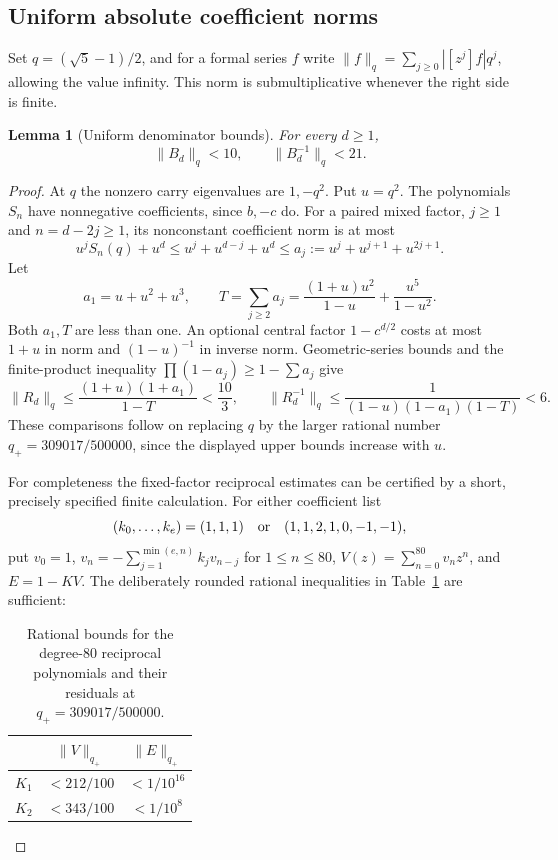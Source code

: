 \documentclass[11pt]{amsart}
\newtheorem{lemma}[theorem]{Lemma}
\theoremstyle{definition}
\theoremstyle{remark}
\numberwithin{equation}{section}
\begin{document}
\subsection{Uniform absolute coefficient norms}

Set $q=(\sqrt5-1)/2$, and for a formal series $f$ write
$\|f\|_q=\sum_{j\ge0}|[z^j]f|q^j$, allowing the value infinity.
This norm is submultiplicative whenever the right side is finite.

\begin{lemma}[Uniform denominator bounds]\label{raw:wiener}
For every $d\ge1$,
\begin{equation}\label{raw:norms}
 \|B_d\|_q<10,\qquad \|B_d^{-1}\|_q<21.
\end{equation}
\end{lemma}
\begin{proof}
At $q$ the nonzero carry eigenvalues are $1,-q^2$.  Put $u=q^2$.
The polynomials $S_n$ have nonnegative coefficients, since $b,-c$ do.
For a paired mixed factor, $j\ge1$ and $n=d-2j\ge1$, its nonconstant
coefficient norm is at most
\[
 u^jS_n(q)+u^d\le u^j+u^{d-j}+u^d
                  \le a_j:=u^j+u^{j+1}+u^{2j+1}.
\]
Let
\[
 a_1=u+u^2+u^3,\qquad
 T=\sum_{j\ge2}a_j=\frac{(1+u)u^2}{1-u}+\frac{u^5}{1-u^2}.
\]
Both $a_1,T$ are less than one.  An optional central factor
$1-c^{d/2}$ costs at most $1+u$ in norm and $(1-u)^{-1}$ in
inverse norm.  Geometric-series bounds and the finite-product inequality
$\prod(1-a_j)\ge1-\sum a_j$ give
\begin{equation}\label{raw:mixed-norms}
 \|R_d\|_q\le\frac{(1+u)(1+a_1)}{1-T}<\frac{10}{3},\qquad
 \|R_d^{-1}\|_q\le\frac1{(1-u)(1-a_1)(1-T)}<6.
\end{equation}
These comparisons follow on replacing $q$ by the larger rational number
$q_+=309017/500000$, since the displayed upper bounds increase with $u$.

For completeness the fixed-factor reciprocal estimates can be certified
by a short, precisely specified finite calculation.  For either coefficient
list
\[
 (k_0,\ldots,k_e)=(1,1,1)\quad\hbox{or}\quad
 (1,1,2,1,0,-1,-1),
\]
put $v_0=1$, $v_n=-\sum_{j=1}^{\min(e,n)}k_jv_{n-j}$ for
$1\le n\le80$, $V(z)=\sum_{n=0}^{80}v_nz^n$, and $E=1-KV$.
The deliberately rounded rational inequalities in Table~\ref{tab:raw-reciprocal-residuals} are sufficient:

\begin{table}[ht]
\centering
\caption{Rational bounds for the degree-$80$ reciprocal polynomials
and their residuals at $q_+=309017/500000$.}
\label{tab:raw-reciprocal-residuals}
\begin{tabular}{c|cc}
 & $\|V\|_{q_+}$ & $\|E\|_{q_+}$\\\hline
 $K_1$ & $<212/100$ & $<1/10^{16}$\\
 $K_2$ & $<343/100$ & $<1/10^{8}$
\end{tabular}
\end{table}


\end{proof}
\end{document}
